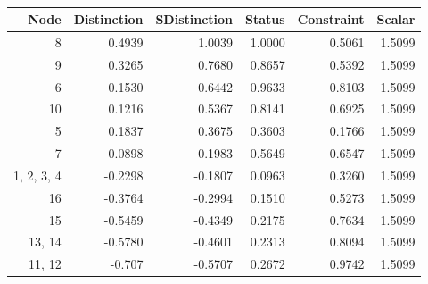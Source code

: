 \begin{table}
\footnotesize
\centering
\caption{\label{tab:tab:search}}
\centering
\begin{tabular}[t]{rrrrrr}
\toprule
Node & Distinction & SDistinction & Status & Constraint & Scalar\\
\midrule
8 & 0.4939 & 1.0039 & 1.0000 & 0.5061 & 1.5099\\
9 & 0.3265 & 0.7680 & 0.8657 & 0.5392 & 1.5099\\
6 & 0.1530 & 0.6442 & 0.9633 & 0.8103 & 1.5099\\
10 & 0.1216 & 0.5367 & 0.8141 & 0.6925 & 1.5099\\
5 & 0.1837 & 0.3675 & 0.3603 & 0.1766 & 1.5099\\
7 & -0.0898 & 0.1983 & 0.5649 & 0.6547 & 1.5099\\
1, 2, 3, 4 & -0.2298 & -0.1807 & 0.0963 & 0.3260 & 1.5099\\
16 & -0.3764 & -0.2994 & 0.1510 & 0.5273 & 1.5099\\
15 & -0.5459 & -0.4349 & 0.2175 & 0.7634 & 1.5099\\
13, 14 & -0.5780 & -0.4601 & 0.2313 & 0.8094 & 1.5099\\
11, 12 & -0.707 & -0.5707 & 0.2672 & 0.9742 & 1.5099\\
\bottomrule
\end{tabular}
\end{table}